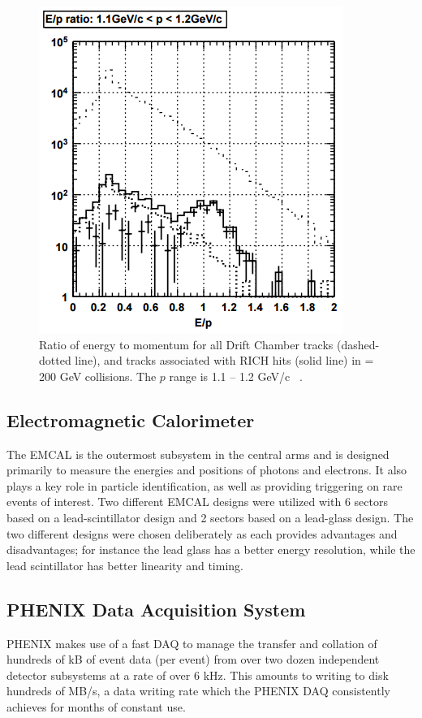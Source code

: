 \begin{figure}[!ht]
\centering
\includegraphics[width=0.55\linewidth]{figs/e_over_p_rich_discrimination.png}
\caption{Ratio of energy to momentum for all Drift Chamber tracks (dashed-dotted line), and tracks associated with RICH hits (solid line) in \auau \sqsn = 200 GeV collisions. The $p$ range is 1.1 -- 1.2 GeV/c ~\cite{Aizawa2003508}.}
\label{fig:rich_discrim_ep}
\end{figure}

\subsection{Electromagnetic Calorimeter}
The EMCAL is the outermost subsystem in the central arms and is designed primarily to measure the energies and positions of photons and electrons. It also plays a key role in particle identification, as well as providing triggering on rare events of interest. Two different EMCAL designs were utilized with 6 sectors based on a lead-scintillator design and 2 sectors based on a lead-glass design. The two different designs were chosen deliberately as each provides advantages and disadvantages; for instance the lead glass has a better energy resolution, while the lead scintillator has better linearity and timing.

\subsection{PHENIX Data Acquisition System}
\label{sec:PHENIX_DAQ}
PHENIX makes use of a fast DAQ to manage the transfer and collation of hundreds of kB of event data (per event) from over two dozen independent detector subsystems at a rate of over 6 kHz. This amounts to writing to disk hundreds of MB/s, a data writing rate which the PHENIX DAQ consistently achieves for months of constant use. 

